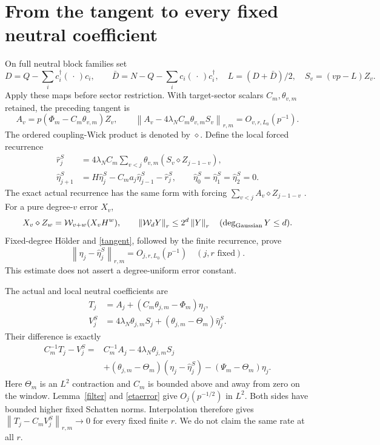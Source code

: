\documentclass[11pt]{article}
\newcommand{\Wick}{\mathcal W}
\newcommand{\norm}[1]{\left\lVert#1\right\rVert}
\newcommand{\eh}{\widehat\eta}
\begin{document}
\newpage
\section{From the tangent to every fixed neutral coefficient}
On full neutral block families set
\[
 D=Q-\sum_i c_i^\dagger(\,\cdot\,)c_i,\qquad
 \bar D=N-Q-\sum_i c_i(\,\cdot\,)c_i^\dagger,\quad
 L=(D+\bar D)/2,\quad S_v=(vp-L)Z_v .
\]
Apply these maps before sector restriction. With target-sector
scalars $C_m,\theta_{v,m}$ retained, the preceding tangent \cite{tangent}
is
\begin{equation}\label{tangent}
 A_v=p(\Phi_m-C_m\theta_{v,m})Z_v,\qquad
 \norm{A_v-4\lambda_NC_m\theta_{v,m}S_v}_{r,m}=O_{v,r,L_0}(p^{-1}).
\end{equation}
The ordered coupling-Wick product is denoted by $\diamond$.
Define the local forced recurrence
\begin{align}
 \widehat r_j^S&=4\lambda_NC_m\sum_{v<j}\theta_{v,m}
                          (S_v\diamond Z_{j-1-v}),\nonumber\\
 \eh_{j+1}^S&=H\eh_j^S-C_ma_j\eh_{j-1}^S-\widehat r_j^S,
 \qquad\eh_0^S=\eh_1^S=\eh_2^S=0 .\label{etarec}
\end{align}
The exact actual recurrence has the same form with forcing
$\sum_{v<j}A_v\diamond Z_{j-1-v}$ \cite{series,operator}.
For a pure degree-$v$ error $X_v$,
\[
 X_v\diamond Z_w=\Wick_{v+w}(X_vH^w),\qquad
 \norm{\Wick_dY}_r\le2^d\norm Y_r\quad(\deg_{\rm Gaussian}Y\le d).
\]
Fixed-degree H\"older and \eqref{tangent}, followed by the finite
recurrence, prove
\begin{equation}\label{etaerror}
 \norm{\eta_j-\eh_j^S}_{r,m}=O_{j,r,L_0}(p^{-1})
 \quad(j,r\text{ fixed}).
\end{equation}
This estimate does not assert a degree-uniform error constant.

The actual and local neutral coefficients are
\begin{align}
 T_j&=A_j+(C_m\theta_{j,m}-\Phi_m)\eta_j,\nonumber\\
 V_j^S&=4\lambda_N\theta_{j,m}S_j+
                    (\theta_{j,m}-\Theta_m)\eh_j^S .\label{TV}
\end{align}
Their difference is exactly
\begin{align}
 C_m^{-1}T_j-V_j^S
 ={}&C_m^{-1}A_j-4\lambda_N\theta_{j,m}S_j\nonumber\\
 &+(\theta_{j,m}-\Theta_m)(\eta_j-\eh_j^S)
       -(\Psi_m-\Theta_m)\eta_j .\label{difference}
\end{align}
Here $\Theta_m$ is an $L^2$ contraction and $C_m$ is bounded above
and away from zero on the window. Lemma~\ref{filter} and
\eqref{etaerror} give $O_j(p^{-1/2})$ in $L^2$.
Both sides have bounded higher fixed Schatten norms. Interpolation
therefore gives $\norm{T_j-C_mV_j^S}_{r,m}\to0$ for every fixed
finite $r$. We do not claim the same rate at all $r$.
\end{document}
